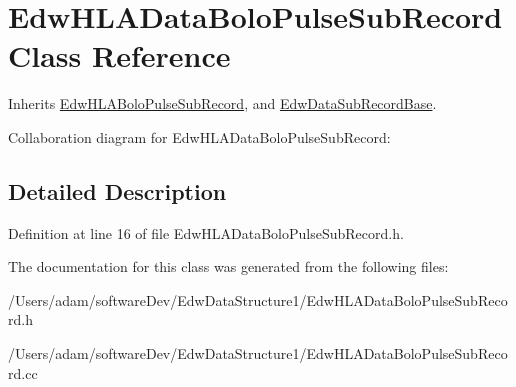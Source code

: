 \hypertarget{class_edw_h_l_a_data_bolo_pulse_sub_record}{
\section{EdwHLADataBoloPulseSubRecord Class Reference}
\label{class_edw_h_l_a_data_bolo_pulse_sub_record}
}


Inherits \hyperlink{class_edw_h_l_a_bolo_pulse_sub_record}{EdwHLABoloPulseSubRecord}, and \hyperlink{class_edw_data_sub_record_base}{EdwDataSubRecordBase}.



Collaboration diagram for EdwHLADataBoloPulseSubRecord:

\subsection{Detailed Description}


Definition at line 16 of file EdwHLADataBoloPulseSubRecord.h.



The documentation for this class was generated from the following files:\begin{DoxyCompactItemize}
\item 
/Users/adam/softwareDev/EdwDataStructure1/EdwHLADataBoloPulseSubRecord.h\item 
/Users/adam/softwareDev/EdwDataStructure1/EdwHLADataBoloPulseSubRecord.cc\end{DoxyCompactItemize}
